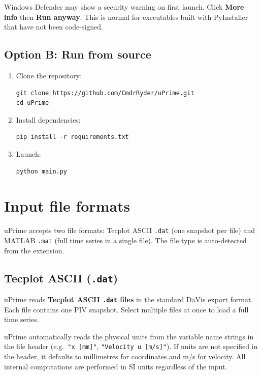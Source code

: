\documentclass[11pt, a4paper]{report}
\newcommand{\software}[1]{\textsf{#1}}
\begin{document}
\begin{notebox}
Windows Defender may show a security warning on first launch. Click \textbf{More info} then \textbf{Run anyway}. This is normal for executables built with PyInstaller that have not been code-signed.
\end{notebox}

\subsection{Option B: Run from source}

\begin{enumerate}[leftmargin=1.5em]
  \item Clone the repository:
\begin{verbatim}
git clone https://github.com/CmdrRyder/uPrime.git
cd uPrime
\end{verbatim}
  \item Install dependencies:
\begin{verbatim}
pip install -r requirements.txt
\end{verbatim}
  \item Launch:
\begin{verbatim}
python main.py
\end{verbatim}
\end{enumerate}

\section{Input file formats}
\label{sec:input}

\software{uPrime} accepts two file formats: Tecplot ASCII \texttt{.dat} (one snapshot per file) and MATLAB \texttt{.mat} (full time series in a single file). The file type is auto-detected from the extension.

\subsection{Tecplot ASCII (\texttt{.dat})}

\software{uPrime} reads \textbf{Tecplot ASCII \texttt{.dat} files} in the standard DaVis export format. Each file contains one PIV snapshot. Select multiple files at once to load a full time series.

\software{uPrime} automatically reads the physical units from the variable name strings in the file header (e.g.\ \texttt{"x [mm]"}, \texttt{"Velocity u [m/s]"}). If units are not specified in the header, it defaults to millimetres for coordinates and m/s for velocity. All internal computations are performed in SI units regardless of the input.
\end{document}
